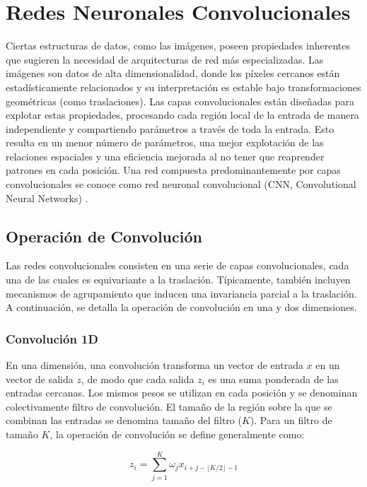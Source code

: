 \section{Redes Neuronales Convolucionales} 
Ciertas estructuras de datos, como las imágenes, poseen propiedades inherentes que sugieren la necesidad de arquitecturas de red más especializadas. Las imágenes son datos de alta dimensionalidad, donde los píxeles cercanos están estadísticamente relacionados y su interpretación es estable bajo transformaciones geométricas (como traslaciones). Las capas convolucionales están diseñadas para explotar estas propiedades, procesando cada región local de la entrada de manera independiente y compartiendo parámetros a través de toda la entrada. Esto resulta en un menor número de parámetros, una mejor explotación de las relaciones espaciales y una eficiencia mejorada al no tener que reaprender patrones en cada posición. Una red compuesta predominantemente por capas convolucionales se conoce como red neuronal convolucional (CNN, Convolutional Neural Networks) \cite{Goodfellow16}.

\subsection{Operación de Convolución}
Las redes convolucionales consisten en una serie de capas convolucionales, cada una de las cuales es equivariante a la traslación. Típicamente, también incluyen mecanismos de agrupamiento que inducen una invariancia parcial a la traslación. A continuación, se detalla la operación de convolución en una y dos dimensiones.

\subsubsection{Convolución 1D}

En una dimensión, una convolución transforma un vector de entrada $x$ en un vector de salida $z$, de modo que cada salida $z_i$ es una suma ponderada de las entradas cercanas. Los mismos pesos se utilizan en cada posición y se denominan colectivamente filtro de convolución. El tamaño de la región sobre la que se combinan las entradas se denomina tamaño del filtro ($K$). Para un filtro de tamaño $K$, la operación de convolución se define generalmente como:

\begin{equation}
z_i = \sum_{j=1}^{K} \omega_j x_{i+j - \lfloor K/2 \rfloor -1}
\label{eq:conv1d}
\end{equation}

